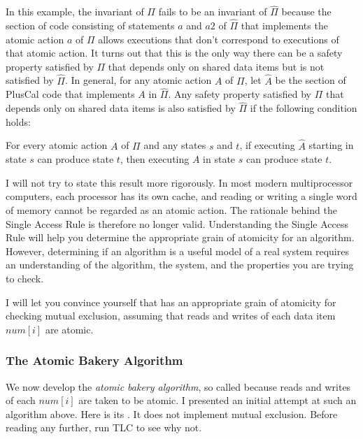 \documentclass[fleqn,leqno]{article}
\begin{document}
In this example, the invariant of $\Pi$ fails to be an invariant of
$\widehat{\Pi}$ because the section of code consisting of statements
$a$ and $a2$ of $\widehat{\Pi}$ that implements the atomic action
$a$ of $\Pi$ allows executions that don't correspond to
executions of that atomic action.  It turns out that this is the
only way there can be a safety property satisfied by $\Pi$ that depends
only on shared data items but is not satisfied by $\widehat{\Pi}$.
In general, for any atomic action $A$ of $\Pi$, let $\widehat{A}$
be the section of PlusCal code that implements $A$ in $\widehat{\Pi}$.
Any safety property satisfied by $\Pi$ that depends only on shared
data items is also satisfied by $\widehat{\Pi}$ if the following condition
holds:
\begin{display}
For every atomic action $A$ of $\Pi$ and any states $s$ and $t$,
if executing $\widehat{A}$ starting in state $s$ can produce state $t$,
then executing $A$ in state $s$ can produce state $t$.
\end{display}
I will not try to state this result more rigorously.  In most modern
multiprocessor computers, each processor has its own cache, and
reading or writing a single word of memory cannot be regarded as an
atomic action.  The rationale behind the Single Access Rule is
therefore no longer valid.  Understanding the Single Access Rule will
help you determine the appropriate grain of atomicity for an algorithm.
However, determining if an algorithm is a useful model of a real system
requires an understanding of the algorithm, the system, and the
properties you are trying to check.

\medskip

I will let you convince yourself that  has an appropriate grain of atomicity for
checking mutual exclusion, assuming that reads and writes of each data
item $num[i]$ are atomic.

%
%

\subsubsection{The Atomic Bakery Algorithm}

We now develop the \emph{atomic bakery algorithm}, so called because
reads and writes of each $num[i]$ are taken to be atomic.  I presented
an initial attempt at such an algorithm above.  Here is its 
.  It does not implement
mutual exclusion.  Before reading any further, run TLC to see why not.
\end{document}
